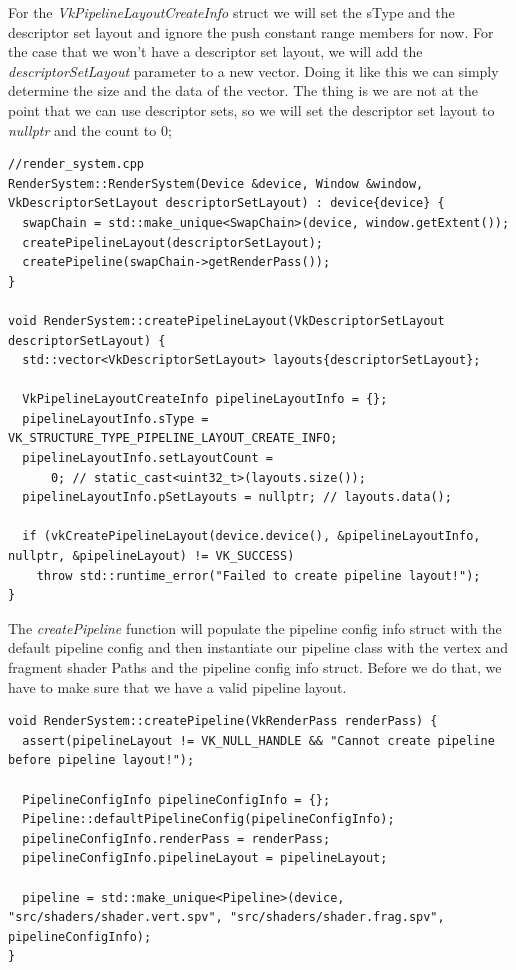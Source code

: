 \documentclass[12pt]{report} \usepackage{preamble}
\begin{document}
For the \textit{VkPipelineLayoutCreateInfo} struct we will set the sType and the descriptor set layout and ignore the
push constant range members for now. For the case that we won't have a descriptor set layout, we will add the \textit{descriptorSetLayout}
parameter to a new vector. Doing it like this we can simply determine the size and the data of the vector. The thing is we are
not at the point that we can use descriptor sets, so we will set the descriptor set layout to \textit{nullptr} and the count to 0;

\begin{lstlisting}[Language=C++]
//render_system.cpp
RenderSystem::RenderSystem(Device &device, Window &window, VkDescriptorSetLayout descriptorSetLayout) : device{device} {
  swapChain = std::make_unique<SwapChain>(device, window.getExtent());
  createPipelineLayout(descriptorSetLayout);
  createPipeline(swapChain->getRenderPass());
}

void RenderSystem::createPipelineLayout(VkDescriptorSetLayout descriptorSetLayout) {
  std::vector<VkDescriptorSetLayout> layouts{descriptorSetLayout};

  VkPipelineLayoutCreateInfo pipelineLayoutInfo = {};
  pipelineLayoutInfo.sType = VK_STRUCTURE_TYPE_PIPELINE_LAYOUT_CREATE_INFO;
  pipelineLayoutInfo.setLayoutCount =
      0; // static_cast<uint32_t>(layouts.size());
  pipelineLayoutInfo.pSetLayouts = nullptr; // layouts.data();

  if (vkCreatePipelineLayout(device.device(), &pipelineLayoutInfo, nullptr, &pipelineLayout) != VK_SUCCESS)
    throw std::runtime_error("Failed to create pipeline layout!");
}
\end{lstlisting}

The \textit{createPipeline} function will populate the pipeline config info struct with the default pipeline config and
then instantiate our pipeline class with the vertex and fragment shader Paths and the pipeline config info struct.
Before we do that, we have to make sure that we have a valid pipeline layout.

\begin{lstlisting}[Language=C++]
void RenderSystem::createPipeline(VkRenderPass renderPass) {
  assert(pipelineLayout != VK_NULL_HANDLE && "Cannot create pipeline before pipeline layout!");
  
  PipelineConfigInfo pipelineConfigInfo = {};
  Pipeline::defaultPipelineConfig(pipelineConfigInfo);
  pipelineConfigInfo.renderPass = renderPass;
  pipelineConfigInfo.pipelineLayout = pipelineLayout;

  pipeline = std::make_unique<Pipeline>(device, "src/shaders/shader.vert.spv", "src/shaders/shader.frag.spv", pipelineConfigInfo);
}
\end{lstlisting}
\end{document}
